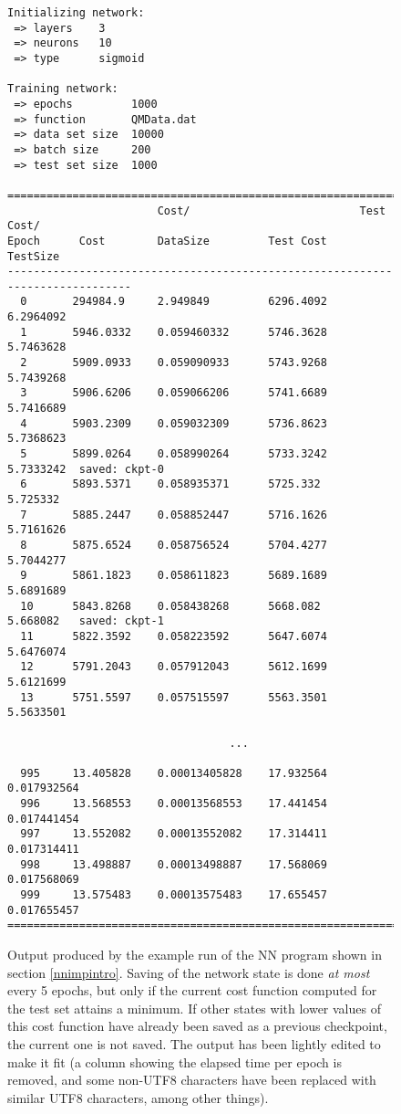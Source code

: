 \documentclass[../../master.tex]{subfiles}
\begin{document}
\begin{figure}[p]
\begin{lstlisting}
Initializing network:
 => layers    3
 => neurons   10
 => type      sigmoid
 
Training network:
 => epochs         1000
 => function       QMData.dat
 => data set size  10000
 => batch size     200
 => test set size  1000
 
==============================================================================
                       Cost/                          Test Cost/
Epoch      Cost        DataSize         Test Cost     TestSize
------------------------------------------------------------------------------
  0       294984.9     2.949849         6296.4092     6.2964092           
  1       5946.0332    0.059460332      5746.3628     5.7463628           
  2       5909.0933    0.059090933      5743.9268     5.7439268           
  3       5906.6206    0.059066206      5741.6689     5.7416689           
  4       5903.2309    0.059032309      5736.8623     5.7368623           
  5       5899.0264    0.058990264      5733.3242     5.7333242  saved: ckpt-0         
  6       5893.5371    0.058935371      5725.332      5.725332            
  7       5885.2447    0.058852447      5716.1626     5.7161626           
  8       5875.6524    0.058756524      5704.4277     5.7044277           
  9       5861.1823    0.058611823      5689.1689     5.6891689           
  10      5843.8268    0.058438268      5668.082      5.668082   saved: ckpt-1
  11      5822.3592    0.058223592      5647.6074     5.6476074           
  12      5791.2043    0.057912043      5612.1699     5.6121699           
  13      5751.5597    0.057515597      5563.3501     5.5633501          
    
                                  ...                                      
          
  995     13.405828    0.00013405828    17.932564     0.017932564         
  996     13.568553    0.00013568553    17.441454     0.017441454         
  997     13.552082    0.00013552082    17.314411     0.017314411         
  998     13.498887    0.00013498887    17.568069     0.017568069         
  999     13.575483    0.00013575483    17.655457     0.017655457  
============================================================================== 
  \end{lstlisting}
\caption{Output produced by the example run of the NN program shown in section \ref{nnimpintro}. Saving of the network state is done \emph{at most} every 5 epochs, but only if the current cost function computed for the test set attains a minimum. If other states with lower values of this cost function have already been saved as a previous checkpoint, the current one is not saved. The output has been lightly edited to make it fit (a column showing the elapsed time per epoch is removed, and some non-UTF8 characters have been replaced with similar UTF8 characters, among other things). \label{fig:nnexample}}
\end{figure}
\end{document}

